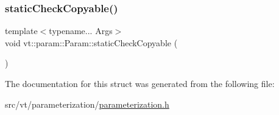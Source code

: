 \subsubsection{\texorpdfstring{static\+Check\+Copyable()}{staticCheckCopyable()}}
{\footnotesize\ttfamily template$<$typename... Args$>$ \\
void vt\+::param\+::\+Param\+::static\+Check\+Copyable (\begin{DoxyParamCaption}{ }\end{DoxyParamCaption})\hspace{0.3cm}{\ttfamily [inline]}}



The documentation for this struct was generated from the following file\+:\begin{DoxyCompactItemize}
\item 
src/vt/parameterization/\hyperlink{parameterization_8h}{parameterization.\+h}\end{DoxyCompactItemize}
